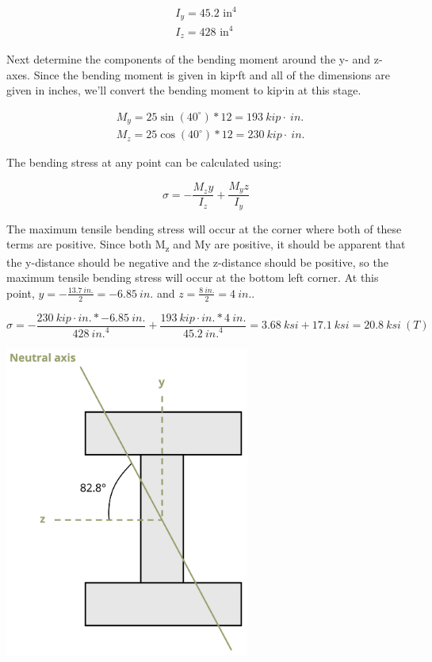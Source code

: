 \documentclass[
  letterpaper,
  DIV=11,
  numbers=noendperiod]{scrreprt}
\begin{document}
\begin{tcolorbox}
\begin{tcolorbox}
\[
\begin{gathered}
I_y=45.2 \text{ in}^4 \\
I_z=428 \text{ in}^4
\end{gathered}
\]

Next determine the components of the bending moment around the y- and
z-axes. Since the bending moment is given in kip⸱ft and all of the
dimensions are given in inches, we'll convert the bending moment to
kip⸱in at this stage.

\[
\begin{aligned}
& M_y=25 \sin \left(40^{\circ}\right) * 12=193{~kip}\cdot{~in.} \\
& M_z=25 \cos \left(40^{\circ}\right) * 12=230{~kip}\cdot{~in.}
\end{aligned}
\]

The bending stress at any point can be calculated using:

\[
\sigma=-\frac{M_z y}{I_z}+\frac{M_y z}{I_y}
\]

The maximum tensile bending stress will occur at the corner where both
of these terms are positive. Since both M\textsubscript{z} and My are
positive, it should be apparent that the y-distance should be negative
and the z-distance should be positive, so the maximum tensile bending
stress will occur at the bottom left corner. At this point,
\(y=-\frac{13.7{~in.}}{2}=-6.85{~in.}\) and
\(z=\frac{8{~in.}}{2}=4{~in.}\).

\[
\sigma=-\frac{230{~kip}\cdot{in.} *-6.85{~in.}}{428{~in.}^4}+\frac{193{~kip}\cdot{in.} * 4{~in.}}{45.2{~in.}^4}=3.68{~ksi}+17.1{~ksi}=20.8{~ksi}~(T)
\]

\begin{center}
\includegraphics[width=3.16667in,height=\textheight]{images/CH9 PNGs/Example 9.6 part 3.png}
\end{center}


\end{tcolorbox}
\end{tcolorbox}
\end{document}
